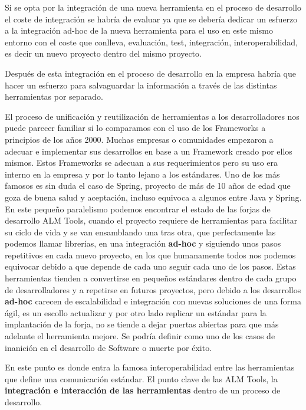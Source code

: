 \par Si se opta por la integración de una nueva herramienta en el proceso de desarrollo el coste de integración se habría de evaluar ya que se debería dedicar un esfuerzo a la integración ad-hoc de la nueva herramienta para el uso en este mismo entorno con el coste que conlleva, evaluación, test, integración, interoperabilidad, es decir un nuevo proyecto dentro del mismo proyecto.

\par Después de esta integración en el proceso de desarrollo en la empresa habría que hacer un esfuerzo para salvaguardar la información a través de las distintas herramientas por separado.

\par El proceso de unificación y reutilización de herramientas a los desarrolladores nos puede parecer familiar si lo comparamos con el uso de los Frameworks a principios de los años 2000. Muchas empresas o comunidades empezaron a adecuar e implementar sus desarrollos en base a un Framework creado por ellos mismos. Estos Frameworks se adecuan a sus requerimientos pero su uso era interno en la empresa y por lo tanto lejano a los estándares. Uno de los más famosos es sin duda el caso de Spring, proyecto de más de 10 años de edad que goza de buena salud y aceptación, incluso equivoca a algunos entre Java y Spring. En este pequeño paralelismo podemos encontrar el estado de las forjas de desarrollo ALM Tools, cuando el proyecto requiere de herramientas para facilitar su ciclo de vida y se van ensamblando una tras otra, que perfectamente las podemos llamar librerías, en una integración \textbf{ad-hoc} y siguiendo unos pasos repetitivos en cada nuevo proyecto, en los que humanamente todos nos podemos equivocar debido a que depende de cada uno seguir cada uno de los pasos. Estas herramientas tienden a convertirse en pequeños estándares dentro de cada grupo de desarrolladores y a repetirse en futuros proyectos, pero debido a los desarrollos \textbf{ad-hoc} carecen de escalabilidad e integración con nuevas soluciones de una forma ágil, es un escollo actualizar y por otro lado replicar un estándar para la implantación de la forja, no se tiende a dejar puertas abiertas para que más adelante el herramienta mejore. Se podría definir como uno de los casos de inanición en el desarrollo de Software o muerte por éxito.

\par En este punto es donde entra la famosa interoperabilidad entre las herramientas que define una comunicación estándar. El punto clave de las ALM Tools, la \textbf{integración e interacción de las herramientas} dentro de un proceso de desarrollo.

